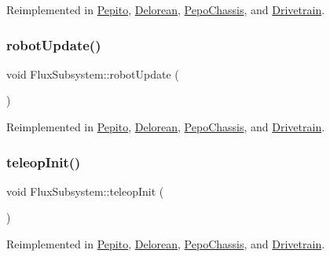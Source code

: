 Reimplemented in \hyperlink{classPepito_a1eed9bef768f3694d8bdfb4f610b8e3a}{Pepito}, \hyperlink{classDelorean_a591e1b68a21a82c7e1cf4e7dbf5294a2}{Delorean}, \hyperlink{classPepoChassis_a18dd25fff35cf7ccac6b710e329873e6}{Pepo\+Chassis}, and \hyperlink{classDrivetrain_a7e9c10a27b3cc5ad89f2338de39b7c62}{Drivetrain}.

\mbox{\label{classFluxSubsystem_ac2b1c08b53251870e945edf7080c1549}} 
\subsubsection{\texorpdfstring{robot\+Update()}{robotUpdate()}}
{\footnotesize\ttfamily void Flux\+Subsystem\+::robot\+Update (\begin{DoxyParamCaption}{ }\end{DoxyParamCaption})\hspace{0.3cm}{\ttfamily [virtual]}}



Reimplemented in \hyperlink{classPepito_a0894a64d02550bb35b4e3eefa3ac4934}{Pepito}, \hyperlink{classDelorean_a47b9cfdb59a6f46ee26f45f794e313c1}{Delorean}, \hyperlink{classPepoChassis_acd6fa29da41ac5108af7e3a1f15218aa}{Pepo\+Chassis}, and \hyperlink{classDrivetrain_a2a2b5976426dc0c1f45438fd7a5926e4}{Drivetrain}.

\mbox{\label{classFluxSubsystem_aec6d05e4f80c3783684598fb92ad2e55}} 
\subsubsection{\texorpdfstring{teleop\+Init()}{teleopInit()}}
{\footnotesize\ttfamily void Flux\+Subsystem\+::teleop\+Init (\begin{DoxyParamCaption}{ }\end{DoxyParamCaption})\hspace{0.3cm}{\ttfamily [virtual]}}



Reimplemented in \hyperlink{classPepito_a5001bee2d7dcc225c87ac36d5eddc452}{Pepito}, \hyperlink{classDelorean_a789c6e4e70f4e2cfdf944d1a1a149509}{Delorean}, \hyperlink{classPepoChassis_a44dbc37a56fe98d7b57af840e8da73b2}{Pepo\+Chassis}, and \hyperlink{classDrivetrain_a12d7edbb3a1b5d4ffa4ecb381c1ab115}{Drivetrain}.

